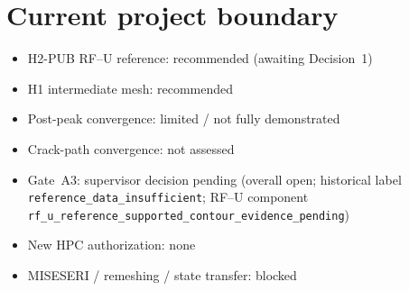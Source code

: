 \documentclass[11pt,a4paper]{article}
\begin{document}
\section*{Current project boundary}
\begin{itemize}
  \item H2-PUB RF--U reference: recommended (awaiting Decision~1)
  \item H1 intermediate mesh: recommended
  \item Post-peak convergence: limited / not fully demonstrated
  \item Crack-path convergence: not assessed
  \item Gate~A3: supervisor decision pending (overall open; historical label \texttt{reference\_data\_insufficient}; RF--U component \texttt{rf\_u\_reference\_supported\_contour\_evidence\_pending})
  \item New HPC authorization: none
  \item MISESERI / remeshing / state transfer: blocked
\end{itemize}
\end{document}
